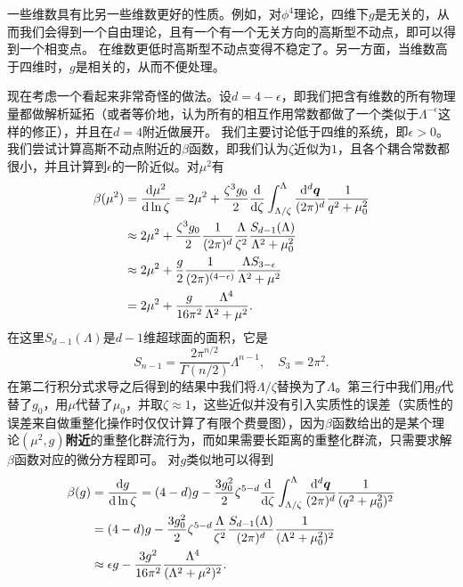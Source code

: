 \documentclass[hyperref, UTF8, a4paper]{ctexart}
\renewcommand{\emph}[1]{\textbf{#1}}
\begin{document}
一些维数具有比另一些维数更好的性质。例如，对$\phi^4$理论，四维下$g$是无关的，从而我们会得到一个自由理论，且有一个有一个无关方向的高斯型不动点，即可以得到一个相变点。
在维数更低时高斯型不动点变得不稳定了。另一方面，当维数高于四维时，$g$是相关的，从而不便处理。

现在考虑一个看起来非常奇怪的做法。设$d=4 - \epsilon$，即我们把含有维数的所有物理量都做解析延拓（或者等价地，认为所有的相互作用常数都做了一个类似于$\Lambda^{-\epsilon}$这样的修正），并且在$d=4$附近做展开。
我们主要讨论低于四维的系统，即$\epsilon>0$。
我们尝试计算高斯不动点附近的$\beta$函数，即我们认为$\zeta$近似为$1$，且各个耦合常数都很小，并且计算到$\epsilon$的一阶近似。对$\mu^2$有
\[
    \begin{aligned}
        \beta(\mu^2) &= \dv{\mu^2}{\ln \zeta} = 2 \mu^2 + \frac{\zeta^3 g_0}{2} \dv{\zeta}  \int^\Lambda_{\Lambda/\zeta} \frac{\dd[d]{\vb*{q}}}{(2\pi)^d} \frac{1}{q^2 + \mu_0^2} \\
        &\approx 2 \mu^2 + \frac{\zeta^3 g_0}{2} \frac{1}{(2\pi)^d} \frac{\Lambda}{\zeta^2}  \frac{S_{d-1}(\Lambda)}{\Lambda^2 + \mu_0^2} \\
        &\approx 2 \mu^2 + \frac{g}{2} \frac{1}{(2\pi)^{(4-\epsilon)}} \frac{\Lambda S_{3-\epsilon}}{\Lambda^2 + \mu^2} \\
        &= 2 \mu^2 + \frac{g}{16 \pi^2} \frac{\Lambda^4}{\Lambda^2 + \mu^2}.
    \end{aligned}
\]
在这里$S_{d-1}(\Lambda)$是$d-1$维超球面的面积，它是
\[
    S_{n-1} = \frac{2 \pi^{n/2}}{\Gamma(n/2)} \Lambda^{n-1}, \quad S_{3} = 2 \pi^2.
\]
在第二行积分式求导之后得到的结果中我们将$\Lambda / \zeta$替换为了$\Lambda$。第三行中我们用$g$代替了$g_0$，用$\mu$代替了$\mu_0$，并取$\zeta \approx 1$，这些近似并没有引入实质性的误差（实质性的误差来自做重整化操作时仅仅计算了有限个费曼图），因为$\beta$函数给出的是某个理论$(\mu^2, g)$\emph{附近}的重整化群流行为，而如果需要长距离的重整化群流，只需要求解$\beta$函数对应的微分方程即可。
对$g$类似地可以得到
\[
    \begin{aligned}
        \beta(g) &= \dv{g}{\ln \zeta} = (4-d) g - \frac{3 g_0^2}{2} \zeta^{5-d} \dv{\zeta} \int^\Lambda_{\Lambda/\zeta} \frac{\dd[d]{\vb*{q}}}{(2\pi)^d} \frac{1}{(q^2 + \mu_0^2)^2} \\
        &= (4-d) g - \frac{3 g_0^2}{2} \zeta^{5-d} \frac{\Lambda}{\zeta^2} \frac{S_{d-1}(\Lambda)}{(2\pi)^d} \frac{1}{(\Lambda^2 + \mu_0^2)^2} \\
        &\approx \epsilon g - \frac{3 g^2}{16 \pi^2} \frac{\Lambda^4}{(\Lambda^2 + \mu^2)^2}.
    \end{aligned}
\]
\end{document}
